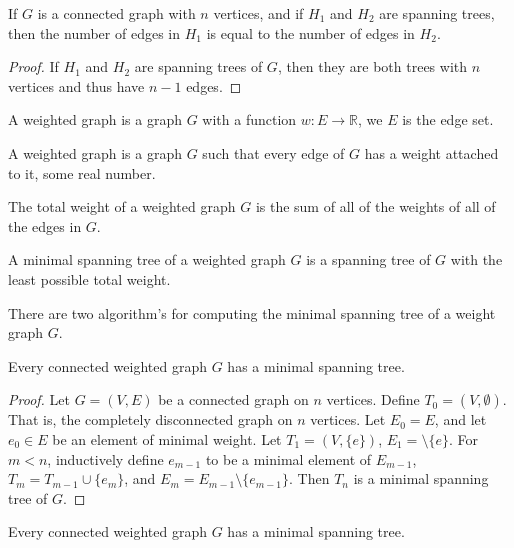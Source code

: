         \begin{theorem}
            If $G$ is a connected graph with $n$ vertices, and if
            $H_{1}$ and $H_{2}$ are spanning trees,
            then the number of edges in $H_{1}$ is equal to
            the number of edges in $H_{2}$.
        \end{theorem}
        \begin{proof}
            If $H_{1}$ and $H_{2}$ are spanning trees of
            $G$, then they are both trees with $n$ vertices and
            thus have $n-1$ edges.
        \end{proof}
        \begin{definition}
            A weighted graph is a graph $G$ with a function
            $w:E\rightarrow\mathbb{R}$, we $E$ is the edge set.
        \end{definition}
        A weighted graph is a graph $G$ such that every edge of $G$ has
        a weight attached to it, some real number.
        \begin{definition}
            The total weight of a weighted graph $G$ is the
            sum of all of the weights of all of the edges in $G$.
        \end{definition}
        \begin{definition}
            A minimal spanning tree of a weighted graph $G$
            is a spanning tree of $G$ with the least possible
            total weight.
        \end{definition}
        There are two algorithm's for computing the minimal
        spanning tree of a weight graph $G$.
        \begin{theorem}
            Every connected weighted graph $G$
            has a minimal spanning tree.
        \end{theorem}
        \begin{proof}
            Let $G=(V,E)$ be a connected graph on $n$ vertices.
            Define $T_{0}=(V,\emptyset)$. That is, the completely
            disconnected graph on $n$ vertices. Let $E_{0}=E$,
            and let $e_{0}\in{E}$ be an element of minimal weight.
            Let $T_{1}=(V,\{e\})$, $E_{1}=\setminus\{e\}$.
            For $m<n$, inductively define $e_{m-1}$ to be a minimal
            element of $E_{m-1}$, $T_{m}=T_{m-1}\cup\{e_{m}\}$,
            and $E_{m}=E_{m-1}\setminus\{e_{m-1}\}$.
            Then $T_{n}$ is a minimal spanning tree of $G$.
        \end{proof}
        \begin{theorem}
            Every connected weighted graph $G$ has a minimal
            spanning tree.
        \end{theorem}
